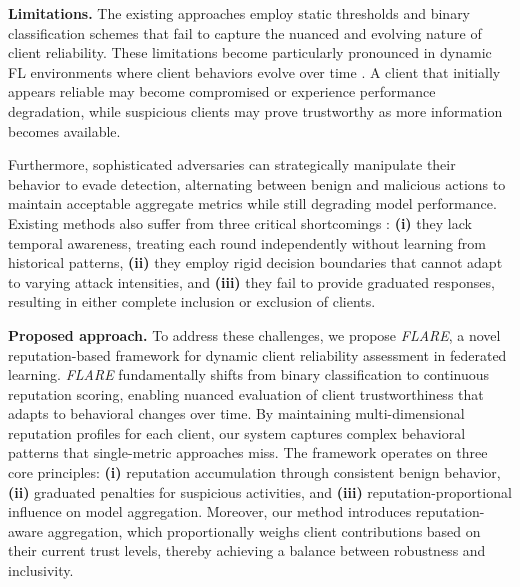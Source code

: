 \documentclass[lettersize,journal]{IEEEtran}
\begin{document}
\textbf{Limitations.} The existing approaches employ static thresholds and binary classification schemes that fail to capture the nuanced and evolving nature of client reliability. These limitations become particularly pronounced in dynamic FL environments where client behaviors evolve over time \cite{11082298,zhao2020local,fang2024byzantine,zhao2022fedinv,penalva2025repunet,tan2022reputation,al2023reputation,fu2022label}. A client that initially appears reliable may become compromised or experience performance degradation, while suspicious clients may prove trustworthy as more information becomes available. 

Furthermore, sophisticated adversaries can strategically manipulate their behavior to evade detection, alternating between benign and malicious actions to maintain acceptable aggregate metrics while still degrading model performance. 
Existing methods also suffer from three critical shortcomings \cite{zhao2020local,fang2024byzantine,zhao2022fedinv,penalva2025repunet,tan2022reputation,al2023reputation,fu2022label,11027323,10713463,10559866,al2022toward}: \textbf{(i)} they lack temporal awareness, treating each round independently without learning from historical patterns, \textbf{(ii)} they employ rigid decision boundaries that cannot adapt to varying attack intensities, and \textbf{(iii)} they fail to provide graduated responses, resulting in either complete inclusion or exclusion of clients.

\textbf{Proposed approach.} To address these challenges, we propose \textit{FLARE}, a novel reputation-based framework for dynamic client reliability assessment in federated learning. \textit{FLARE} fundamentally shifts from binary classification to continuous reputation scoring, enabling nuanced evaluation of client trustworthiness that adapts to behavioral changes over time. By maintaining multi-dimensional reputation profiles for each client, our system captures complex behavioral patterns that single-metric approaches miss. The framework operates on three core principles: \textbf{(i)} reputation accumulation through consistent benign behavior, \textbf{(ii)} graduated penalties for suspicious activities, and \textbf{(iii)} reputation-proportional influence on model aggregation. Moreover, our method introduces reputation-aware aggregation, which proportionally weighs client contributions based on their current trust levels, thereby achieving a balance between robustness and inclusivity.
\end{document}
